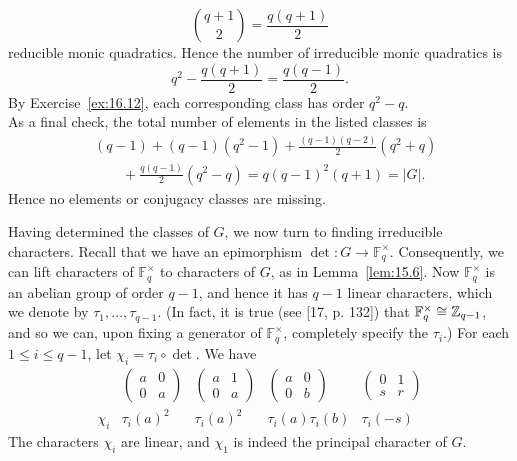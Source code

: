 \documentclass[../Odyssey_Project.tex]{subfiles}
\begin{document}
\begin{solution}
    \[
        \binom{q+1}{2}=\frac{q(q+1)}{2}
    \]
    reducible monic quadratics. Hence the number of irreducible monic quadratics is
    \[
        q^2-\frac{q(q+1)}{2}
        =
        \frac{q(q-1)}{2}.
    \]
    By Exercise~\ref{ex:16.12}, each corresponding class has order $q^2-q$.\\
    As a final check, the total number of elements in the listed classes is
    \begin{align*}
        &(q-1)
        +(q-1)(q^2-1)
        +\frac{(q-1)(q-2)}{2}(q^2+q) \\
        &\qquad
        +\frac{q(q-1)}{2}(q^2-q)
        =
        q(q-1)^2(q+1)
        =
        |G|.
    \end{align*}
    Hence no elements or conjugacy classes are missing.
\end{solution}

\noindent Having determined the classes of $G$, we now turn to finding irreducible characters. Recall that we have an epimorphism $\det: G \to \mathbb{F}_q^\times$. Consequently, we can lift characters of $\mathbb{F}_q^\times$ to characters of $G$, as in Lemma~\ref{lem:15.6}. Now $\mathbb{F}_q^\times$ is an abelian group of order $q - 1$, and hence it has $q - 1$ linear characters, which we denote by $\tau_1, \dots, \tau_{q-1}$. (In fact, it is true (see [17, p. 132]) that $\mathbb{F}_q^\times \cong \mathbb{Z}_{q-1}$, and so we can, upon fixing a generator of $\mathbb{F}_q^\times$, completely specify the $\tau_i$.) For each $1 \leq i \leq q - 1$, let $\chi_i = \tau_i \circ \det$. We have
\[
\begin{array}{c|cccc}
 & \begin{pmatrix} a & 0 \\ 0 & a \end{pmatrix} & \begin{pmatrix} a & 1 \\ 0 & a \end{pmatrix} & \begin{pmatrix} a & 0 \\ 0 & b \end{pmatrix} & \begin{pmatrix} 0 & 1 \\ s & r \end{pmatrix} \\
\hline
\chi_i & \tau_i(a)^2 & \tau_i(a)^2 & \tau_i(a) \tau_i(b) & \tau_i(-s)
\end{array}
\]
The characters $\chi_i$ are linear, and $\chi_1$ is indeed the principal character of $G$.
\end{document}
